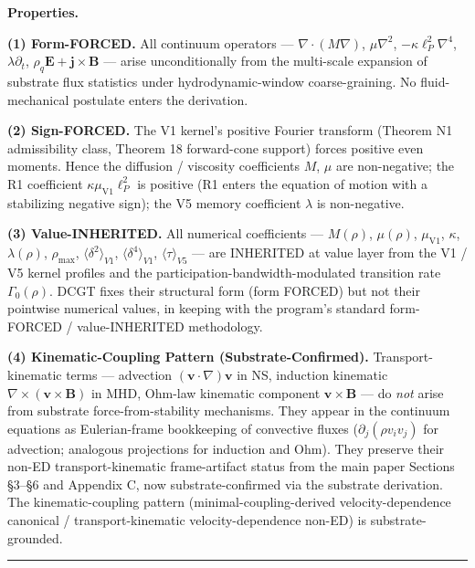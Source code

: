 \documentclass[
  11pt,a4paper]{article}
\begin{document}
\textbf{Properties.}

\textbf{(1) Form-FORCED.} All continuum operators ---
\(\nabla\cdot(M\nabla)\), \(\mu\nabla^2\), \(-\kappa\ell_P^2\nabla^4\),
\(\lambda\partial_t\), \(\rho_q\mathbf{E} + \mathbf{j}\times\mathbf{B}\)
--- arise unconditionally from the multi-scale expansion of substrate
flux statistics under hydrodynamic-window coarse-graining. No
fluid-mechanical postulate enters the derivation.

\textbf{(2) Sign-FORCED.} The V1 kernel's positive Fourier transform
(Theorem N1 admissibility class, Theorem 18 forward-cone support) forces
positive even moments. Hence the diffusion / viscosity coefficients
\(M\), \(\mu\) are non-negative; the R1 coefficient
\(\kappa\mu_\mathrm{V1}\ell_P^2\) is positive (R1 enters the equation of
motion with a stabilizing negative sign); the V5 memory coefficient
\(\lambda\) is non-negative.

\textbf{(3) Value-INHERITED.} All numerical coefficients ---
\(M(\rho)\), \(\mu(\rho)\), \(\mu_\mathrm{V1}\), \(\kappa\),
\(\lambda(\rho)\), \(\rho_\mathrm{max}\),
\(\bigl\langle\delta^2\bigr\rangle_{V1}\),
\(\bigl\langle\delta^4\bigr\rangle_{V1}\),
\(\bigl\langle\tau\bigr\rangle_{V5}\) --- are INHERITED at value layer
from the V1 / V5 kernel profiles and the
participation-bandwidth-modulated transition rate \(\Gamma_0(\rho)\).
DCGT fixes their structural form (form FORCED) but not their pointwise
numerical values, in keeping with the program's standard form-FORCED /
value-INHERITED methodology.

\textbf{(4) Kinematic-Coupling Pattern (Substrate-Confirmed).}
Transport-kinematic terms --- advection
\((\mathbf{v}\cdot\nabla)\mathbf{v}\) in NS, induction kinematic
\(\nabla\times(\mathbf{v}\times\mathbf{B})\) in MHD, Ohm-law kinematic
component \(\mathbf{v}\times\mathbf{B}\) --- do \emph{not} arise from
substrate force-from-stability mechanisms. They appear in the continuum
equations as Eulerian-frame bookkeeping of convective fluxes
(\(\partial_j(\rho v_i v_j)\) for advection; analogous projections for
induction and Ohm). They preserve their non-ED transport-kinematic
frame-artifact status from the main paper Sections §3--§6 and Appendix
C, now substrate-confirmed via the substrate derivation. The
kinematic-coupling pattern (minimal-coupling-derived velocity-dependence
canonical / transport-kinematic velocity-dependence non-ED) is
substrate-grounded.

\begin{center}\rule{0.5\linewidth}{0.5pt}\end{center}
\end{document}
